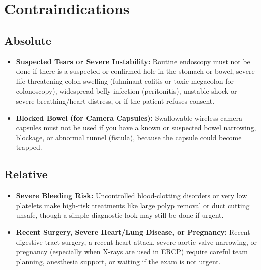 \section{Contraindications}

\subsection{Absolute}
\begin{itemize}
\item \textbf{Suspected Tears or Severe Instability:} Routine endoscopy must not be done if there is a suspected or confirmed hole in the stomach or bowel, severe life-threatening colon swelling (fulminant colitis or toxic megacolon for colonoscopy), widespread belly infection (peritonitis), unstable shock or severe breathing/heart distress, or if the patient refuses consent.
\item \textbf{Blocked Bowel (for Camera Capsules):} Swallowable wireless camera capsules must not be used if you have a known or suspected bowel narrowing, blockage, or abnormal tunnel (fistula), because the capsule could become trapped.
\end{itemize}

\subsection{Relative}
\begin{itemize}
\item \textbf{Severe Bleeding Risk:} Uncontrolled blood-clotting disorders or very low platelets make high-risk treatments like large polyp removal or duct cutting unsafe, though a simple diagnostic look may still be done if urgent.
\item \textbf{Recent Surgery, Severe Heart/Lung Disease, or Pregnancy:} Recent digestive tract surgery, a recent heart attack, severe aortic valve narrowing, or pregnancy (especially when X-rays are used in ERCP) require careful team planning, anesthesia support, or waiting if the exam is not urgent.
\end{itemize}


